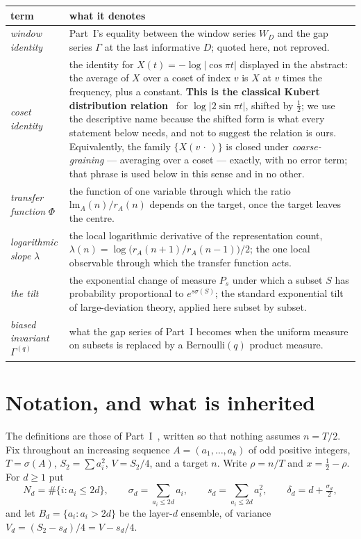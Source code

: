 \documentclass[11pt,a4paper]{article}
\theoremstyle{plain}
\theoremstyle{definition}
\theoremstyle{remark}
\newcommand{\lm}{\mathrm{lm}}
\begin{document}
\begin{table}[htbp]
\centering
\small
\begin{tabular}{@{}p{3.3cm}p{9.5cm}@{}}
\toprule
term & what it denotes\\
\midrule
\emph{window identity} & Part~I's equality between the window series $W_D$ and the gap
series $\Gamma$ at the last informative $D$; quoted here, not reproved.\\[3pt]
\emph{coset identity} & the identity for $X(t)=-\log|\cos\pi t|$ displayed in the
abstract: the average of $X$ over a coset of index $v$ is $X$ at $v$ times the
frequency, plus a constant. \textbf{This is the classical Kubert distribution
relation}~\cite{KL} for $\log|2\sin\pi t|$, shifted by $\tfrac12$; we use the
descriptive name because the shifted form is what every statement below needs, and
not to suggest the relation is ours. Equivalently, the family $\{X(v\,\cdot\,)\}$ is
closed under \emph{coarse-graining} --- averaging over a coset --- exactly, with no
error term; that phrase is used below in this sense and in no other.\\[3pt]
\emph{transfer function} $\Phi$ & the function of one variable through which the
ratio $\lm_A(n)/r_A(n)$ depends on the target, once the target leaves the centre.\\[3pt]
\emph{logarithmic slope} $\lambda$ & the local logarithmic derivative of the
representation count, $\lambda(n)=\log\bigl(r_A(n{+}1)/r_A(n{-}1)\bigr)/2$; the one
local observable through which the transfer function acts.\\[3pt]
\emph{the tilt} & the exponential change of measure $P_s$ under which a subset $S$
has probability proportional to $e^{s\sigma(S)}$; the standard exponential tilt of
large-deviation theory, applied here subset by subset.\\[3pt]
\emph{biased invariant} $\Gamma^{(q)}$ & what the gap series of Part~I becomes when
the uniform measure on subsets is replaced by a Bernoulli$(q)$ product measure.\\
\bottomrule
\end{tabular}
\end{table}

\section{Notation, and what is inherited}\label{sec:notation}

The definitions are those of Part~I~\cite{P1}, written so that nothing assumes $n=T/2$.
Fix throughout an increasing sequence $A=(a_1,\dots,a_k)$ of odd positive integers,
$T=\sigma(A)$, $S_2=\sum a_i^2$, $V=S_2/4$, and a target $n$. Write $\rho=n/T$ and
$x=\tfrac12-\rho$. For $d\ge1$ put
\[
  N_d=\#\{i:a_i\le2d\},\qquad
  \sigma_d=\!\!\sum_{a_i\le 2d}\!\! a_i,\qquad
  s_d=\!\!\sum_{a_i\le 2d}\!\! a_i^{2},\qquad
  \delta_d=d+\tfrac{\sigma_d}{2},
\]
and let $B_d=\{a_i:a_i>2d\}$ be the layer-$d$ ensemble, of variance
$V_d=(S_2-s_d)/4=V-s_d/4$.
\end{document}
